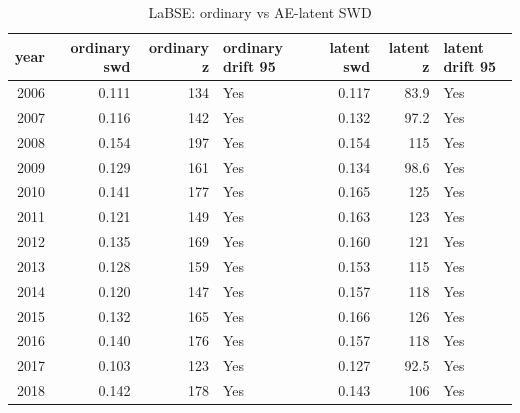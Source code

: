 \begin{table}[ht]
\centering
\caption{LaBSE: ordinary vs AE-latent SWD}
\label{tab:labse_ordinary_vs_latent_swd}
\begin{tabular}{rrrlrrl}
\toprule
year & ordinary swd & ordinary z & ordinary drift 95 & latent swd & latent z & latent drift 95 \\
\midrule
2006 & 0.111 & 134 & Yes & 0.117 & 83.9 & Yes \\
2007 & 0.116 & 142 & Yes & 0.132 & 97.2 & Yes \\
2008 & 0.154 & 197 & Yes & 0.154 & 115 & Yes \\
2009 & 0.129 & 161 & Yes & 0.134 & 98.6 & Yes \\
2010 & 0.141 & 177 & Yes & 0.165 & 125 & Yes \\
2011 & 0.121 & 149 & Yes & 0.163 & 123 & Yes \\
2012 & 0.135 & 169 & Yes & 0.160 & 121 & Yes \\
2013 & 0.128 & 159 & Yes & 0.153 & 115 & Yes \\
2014 & 0.120 & 147 & Yes & 0.157 & 118 & Yes \\
2015 & 0.132 & 165 & Yes & 0.166 & 126 & Yes \\
2016 & 0.140 & 176 & Yes & 0.157 & 118 & Yes \\
2017 & 0.103 & 123 & Yes & 0.127 & 92.5 & Yes \\
2018 & 0.142 & 178 & Yes & 0.143 & 106 & Yes \\
\bottomrule
\end{tabular}
\end{table}
